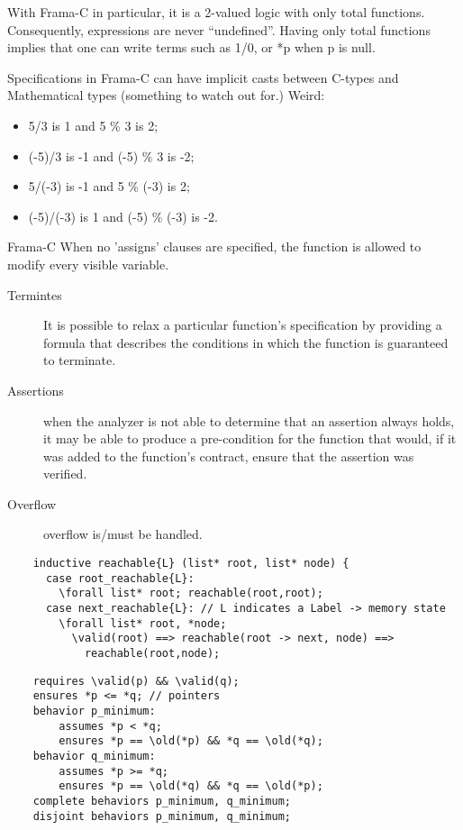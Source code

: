 \documentclass[10pt]{article} %
\begin{document}
With Frama-C in particular, it is a 2-valued logic with only total functions. Consequently, expressions are never “undefined”. Having only total functions implies that one can write terms such as 1\slash 0, or *p when p is null.


Specifications in Frama-C can have implicit casts between C-types and Mathematical types (something to watch out for.)
Weird:

\begin{itemize}
\item 5\slash 3 is 1 and 5 \% 3 is 2;
\item (-5)\slash 3 is -1 and (-5) \% 3 is -2;
\item 5\slash (-3) is -1 and 5 \% (-3) is 2;
\item (-5)\slash (-3) is 1 and (-5) \% (-3) is -2.
\end{itemize}

Frama-C When no 'assigns' clauses are specified, the function is allowed to modify every visible variable.
\begin{description}
\item[Termintes]It is possible to relax a particular function’s specification by providing a formula that describes the conditions in which the function is guaranteed to terminate. 
\item[Assertions]when the analyzer is not able to determine that an assertion always holds, it may be able to produce a pre-condition for the function that would, if it was added to the function’s contract, ensure that the assertion was verified. 
\item[Overflow] overflow is\slash must be handled.
\end{description}


\begin{lstlisting}
	inductive reachable{L} (list* root, list* node) {
	  case root_reachable{L}:
	    \forall list* root; reachable(root,root);
	  case next_reachable{L}: // L indicates a Label -> memory state
	    \forall list* root, *node;
	      \valid(root) ==> reachable(root -> next, node) ==>
	        reachable(root,node);
\end{lstlisting}
\begin{lstlisting}
	requires \valid(p) && \valid(q);
	ensures *p <= *q; // pointers
	behavior p_minimum:
		assumes *p < *q;
		ensures *p == \old(*p) && *q == \old(*q);
	behavior q_minimum:
		assumes *p >= *q;
		ensures *p == \old(*q) && *q == \old(*p);
	complete behaviors p_minimum, q_minimum;
	disjoint behaviors p_minimum, q_minimum;
\end{lstlisting}
\end{document}
